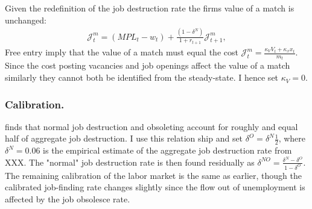 Given the redefinition of the job destruction rate the firms value of a match is unchanged:
\begin{gather*}
\mathcal{J}_{t}^{m}=\left(MPL_{t}-w_{t}\right)+\frac{\left(1-\delta^{N}\right)}{1+r_{t+1}}\mathcal{J}_{t+1}^{m},
\end{gather*}
Free entry imply that the value of a match must equal the cost $\mathcal{J}_{t}^{m}=\frac{\kappa_{V}V_{t}+\kappa_{x}x_{t}}{m_{t}}$. Since the cost posting vacancies and job openings affect the value of a match similarly they cannot both be identified from the steady-state. I hence set $\kappa_{V}=0$. 


\subsubsection{Calibration.} \citet{fujita2007job} finds that normal job destruction and obsoleting account for roughly and equal half of aggregate job destruction. I use this relation ship and set $\delta^{O}=\delta^{N}\frac{1}{2}$, where $\delta^{N}=0.06$ is the empirical estimate of the aggregate job destruction rate from XXX. The "normal" job destruction rate is then found residually as $\delta^{NO}=\frac{\delta^{N}-\delta^{O}}{1-\delta^{O}}$. The remaining calibration of the labor market is the same as earlier, though the calibrated job-finding rate changes slightly since the flow out of unemployment is affected by the job obsolesce rate. 
